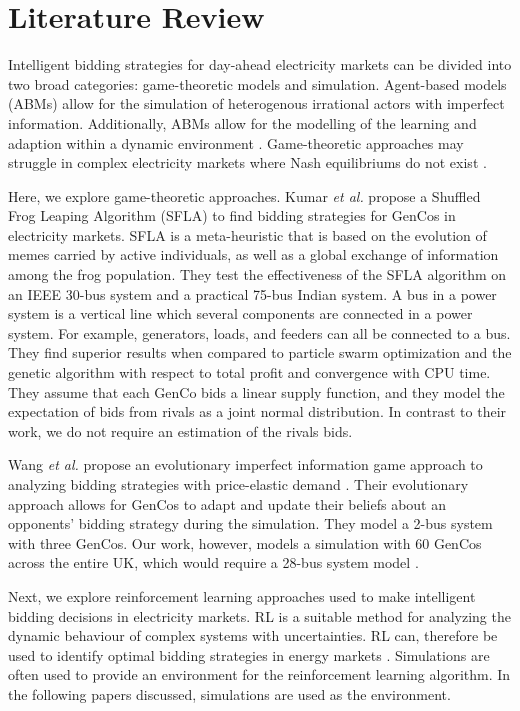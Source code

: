 \documentclass[conference]{IEEEtran}
\begin{document}
\section{Literature Review}
\label{sec:lit-review}

Intelligent bidding strategies for day-ahead electricity markets can be divided into two broad categories: game-theoretic models and simulation. Agent-based models (ABMs) allow for the simulation of heterogenous irrational actors with imperfect information. Additionally, ABMs allow for the modelling of the learning and adaption within a dynamic environment \cite{EsmaeiliAliabadi2017}. Game-theoretic approaches may struggle in complex electricity markets where Nash equilibriums do not exist \cite{Wang2011}.

Here, we explore game-theoretic approaches. Kumar \textit{et al.} propose a Shuffled Frog Leaping Algorithm (SFLA) \cite{VijayaKumar2014} to find bidding strategies for GenCos in electricity markets. SFLA is a meta-heuristic that is based on the evolution of memes carried by active individuals, as well as a global exchange of information among the frog population. They test the effectiveness of the SFLA algorithm on an IEEE 30-bus system and a practical 75-bus Indian system. A bus in a power system is a vertical line which several components are connected in a power system. For example, generators, loads, and feeders can all be connected to a bus. They find superior results when compared to particle swarm optimization and the genetic algorithm with respect to total profit and convergence with CPU time. They assume that each GenCo bids a linear supply function, and they model the expectation of bids from rivals as a joint normal distribution. In contrast to their work, we do not require an estimation of the rivals bids.

Wang \textit{et al.} propose an evolutionary imperfect information game approach to analyzing bidding strategies with price-elastic demand \cite{Wang2011}. Their evolutionary approach allows for GenCos to adapt and update their beliefs about an opponents' bidding strategy during the simulation. They model a 2-bus system with three GenCos. Our work, however, models a simulation with 60 GenCos across the entire UK, which would require a 28-bus system model \cite{Bell2010}. 

Next, we explore reinforcement learning approaches used to make intelligent bidding decisions in electricity markets. RL is a suitable method for analyzing the dynamic behaviour of complex systems with uncertainties. RL can, therefore be used to identify optimal bidding strategies in energy markets \cite{Yang2020}. Simulations are often used to provide an environment for the reinforcement learning algorithm. In the following papers discussed, simulations are used as the environment.
\end{document}
